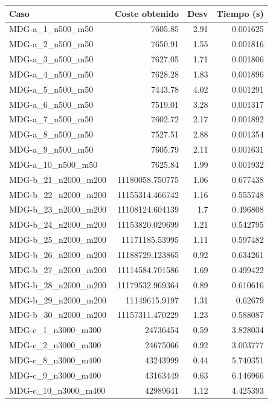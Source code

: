 \documentclass{article}
\begin{document}
\begin{table}[H]
	\centering
	\begin{tabular}{|lrrr|}
		\hline
		Caso & Coste obtenido & Desv & Tiempo (s)\\ \hline
		MDG-a\_1\_n500\_m50 & 7605.85 & 2.91 & 0.001625\\
		MDG-a\_2\_n500\_m50 & 7650.91 & 1.55 & 0.001816\\
		MDG-a\_3\_n500\_m50 & 7627.05 & 1.71 & 0.001806\\
		MDG-a\_4\_n500\_m50 & 7628.28 & 1.83 & 0.001896\\
		MDG-a\_5\_n500\_m50 & 7443.78 & 4.02 & 0.001291\\
		MDG-a\_6\_n500\_m50 & 7519.01 & 3.28 & 0.001317\\
		MDG-a\_7\_n500\_m50 & 7602.72 & 2.17 & 0.001892\\
		MDG-a\_8\_n500\_m50 & 7527.51 & 2.88 & 0.001354\\
		MDG-a\_9\_n500\_m50 & 7605.79 & 2.11 & 0.001631\\
		MDG-a\_10\_n500\_m50 & 7625.84 & 1.99 & 0.001932\\
		MDG-b\_21\_n2000\_m200 & 11180058.750775 & 1.06 & 0.677438\\
		MDG-b\_22\_n2000\_m200 & 11155314.466742 & 1.16 & 0.555748\\
		MDG-b\_23\_n2000\_m200 & 11108124.604139 & 1.7 & 0.496808\\
		MDG-b\_24\_n2000\_m200 & 11153820.029699 & 1.21 & 0.542795\\
		MDG-b\_25\_n2000\_m200 & 11171185.53995 & 1.11 & 0.597482\\
		MDG-b\_26\_n2000\_m200 & 11188729.123865 & 0.92 & 0.634261\\
		MDG-b\_27\_n2000\_m200 & 11114584.701586 & 1.69 & 0.499422\\
		MDG-b\_28\_n2000\_m200 & 11179532.969364 & 0.89 & 0.610616\\
		MDG-b\_29\_n2000\_m200 & 11149615.9197 & 1.31 & 0.62679\\
		MDG-b\_30\_n2000\_m200 & 11157311.470229 & 1.23 & 0.588087\\
		MDG-c\_1\_n3000\_m300 & 24736454 & 0.59 & 3.828034\\
		MDG-c\_2\_n3000\_m300 & 24675066 & 0.92 & 3.003777\\
		MDG-c\_8\_n3000\_m400 & 43243999 & 0.44 & 5.740351\\
		MDG-c\_9\_n3000\_m400 & 43163449 & 0.63 & 6.146966\\
		MDG-c\_10\_n3000\_m400 & 42989641 & 1.12 & 4.425393\\

\end{tabular}
\end{table}
\end{document}
